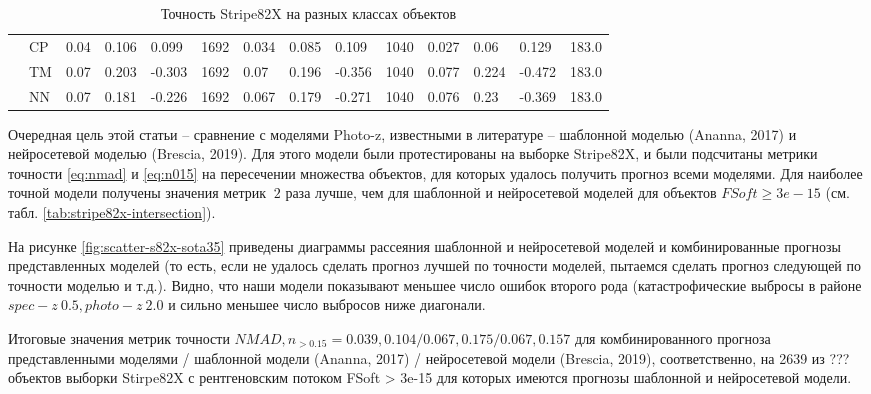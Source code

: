 \documentclass[fleqn,usenatbib]{mnras}
\begin{document}
\begin{table}
\begin{tabular}{lllllrlllrllll}
                & CP &               0.04 &           0.106 &            0.099 &        1692 &              0.034 &           0.085 &            0.109 &        1040 &              0.027 &            0.06 &            0.129 &       183.0 \\
                & TM &               0.07 &           0.203 &           -0.303 &        1692 &               0.07 &           0.196 &           -0.356 &        1040 &              0.077 &           0.224 &           -0.472 &       183.0 \\
                & NN &               0.07 &           0.181 &           -0.226 &        1692 &              0.067 &           0.179 &           -0.271 &        1040 &              0.076 &            0.23 &           -0.369 &       183.0 \\
            \hline
            \end{tabular}
            \caption{Точность Stripe82X на разных классах объектов}
\end{table}

Очередная цель этой статьи -- сравнение с моделями Photo-z, известными в литературе -- шаблонной моделью (Ananna, 2017) и нейросетевой моделью (Brescia, 2019). Для этого модели были протестированы на выборке Stripe82X, и были подсчитаны метрики точности \eqref{eq:nmad} и \eqref{eq:n015} на пересечении множества объектов, для которых удалось получить прогноз всеми моделями. Для наиболее точной модели получены значения метрик $~2$ раза лучше, чем для шаблонной и нейросетевой моделей для объектов $FSoft \geq 3e-15$ (см. табл. \ref{tab:stripe82x-intersection}).

На рисунке \ref{fig:scatter-s82x-sota35} приведены диаграммы рассеяния шаблонной и нейросетевой моделей и комбинированные прогнозы представленных моделей (то есть, если не удалось сделать прогноз лучшей по точности моделей, пытаемся сделать прогноз следующей по точности моделью и т.д.). Видно, что наши модели показывают меньшее число ошибок второго рода (катастрофические выбросы в районе $spec-z ~ 0.5, photo-z ~ 2.0$ и сильно меньшее число выбросов ниже диагонали.

Итоговые значения метрик точности $NMAD, n_{>0.15} = 0.039, 0.104/ 0.067, 0.175/ 0.067, 0.157$ для комбинированного прогноза представленными моделями / шаблонной модели (Ananna, 2017) / нейросетевой модели (Brescia, 2019), соответственно, на 2639 из ??? объектов выборки Stirpe82X с рентгеновским потоком FSoft > 3e-15 для которых имеются прогнозы шаблонной и нейросетевой модели. 
\end{document}

